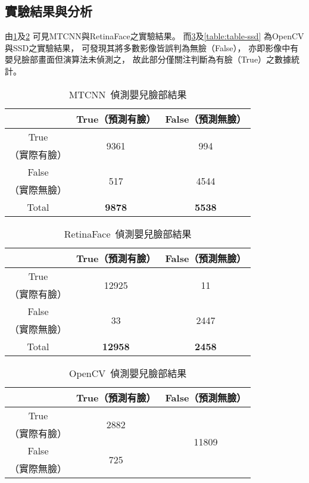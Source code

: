 \documentclass[class=NCU_thesis, crop=false]{standalone}
\begin{document}
\subsection{實驗結果與分析}
由\cref{table:table-mtcnn}及\cref{table:table-retinaface}
可見MTCNN與RetinaFace之實驗結果。
而\cref{table:table-opencv}及\cref{table:table-ssd}
為OpenCV與SSD之實驗結果，
可發現其將多數影像皆誤判為無臉（False），
亦即影像中有嬰兒臉部畫面但演算法未偵測之，
故此部分僅關注判斷為有臉（True）之數據統計。
\begin{table}[h]
    \centering
    \caption{MTCNN~\cite{zhang_joint_2016}偵測嬰兒臉部結果}
    \label{table:table-mtcnn}
    \begin{tabular}{ccc}
    \hline
     & True（預測有臉）& False（預測無臉）\\
    \hline
    True & \multirow{2}{*}{9361} & \multirow{2}{*}{994} \\
    （實際有臉）& & \\
    False & \multirow{2}{*}{517} & \multirow{2}{*}{4544} \\
    （實際無臉）&  & \\
    \hline
    Total & \textbf{9878} & \textbf{5538} \\
    \hline
    \end{tabular}
\end{table}

\begin{table}[h]
    \centering
    \caption{RetinaFace~\cite{deng_retinaface_2020}偵測嬰兒臉部結果}
    \label{table:table-retinaface}
    \begin{tabular}{ccc}
    \hline
     & True（預測有臉）& False（預測無臉）\\
    \hline
    True & \multirow{2}{*}{12925} & \multirow{2}{*}{11} \\
    （實際有臉）& & \\
    False & \multirow{2}{*}{33} & \multirow{2}{*}{2447} \\
    （實際無臉）&  & \\
    \hline
    Total & \textbf{12958} & \textbf{2458} \\
    \hline
    \end{tabular}
\end{table}

\begin{table}[h]
    \centering
    \caption{OpenCV~\cite{goyal_face_2017}偵測嬰兒臉部結果}
    \label{table:table-opencv}
    \begin{tabular}{ccc}
    \hline
     & True（預測有臉）& False（預測無臉）\\
    \hline
    True & \multirow{2}{*}{2882} & \multirow{4}{*}{11809} \\
    （實際有臉）& & \\
    False & \multirow{2}{*}{725} & \\
    （實際無臉）&  & \\
    \hline
    \end{tabular}
\end{table}
\end{document}
